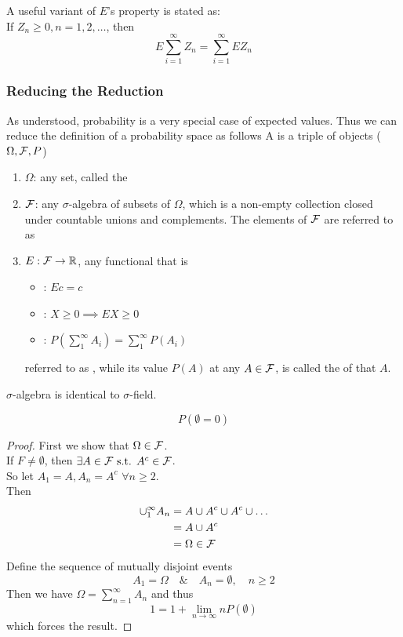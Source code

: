 \documentclass[11pt]{article}
\numberwithin{equation}{section}
\begin{document}
\property[continuity]
A useful variant of $E$'s  property is stated as:\\
If $Z_n \geq 0, n = 1, 2, \hdots$, then 
\begin{equation}
	E\sum_{i=1}^\infty Z_n = \sum_{i=1}^\infty EZ_n
\end{equation}

\subsubsection{Reducing the Reduction}
As understood, probability is a very special case of expected values. Thus we can reduce the definition of a probability space as follows
A  is a triple of objects ($\Omega, \mathcal{F}, P$)
\begin{enumerate}
	\item $\Omega$: any set, called the 
	\item $\mathcal{F}$: any $\sigma$-algebra of subsets of $\Omega$, which is a non-empty collection closed under countable unions and complements. The elements of $\mathcal{F}$ are referred to as 
	\item $E: \mathcal{F} \rightarrow \mathbb{R}$, any functional that is 
	\begin{itemize}
		\item {}: $Ec = c$
		\item {}: $X \geq 0 \implies EX \geq 0$
		\item {}: $P(\sum_1^{\infty}A_i) = \sum_1^{\infty}P(A_i)$
	\end{itemize}
	referred to as , while its value $P(A)$ at any $A \in \mathcal{F}$, is called the  of that $A$.
\end{enumerate} 

\remark
$\sigma$-algebra is identical to $\sigma$-field.

\proposition[nullity]
$$P(\emptyset = 0)$$
\begin{proof}
	First we show that $\Omega \in \mathcal{F}$. \\
	If $F \neq \emptyset$, then $\exists A \in \mathcal{F} \text{ s.t. } A^c \in \mathcal{F}$. \\
	So let $A_1 = A, A_n = A^c \,\, \forall n \geq 2$. \\
	Then 
	\begin{align*}
		\cup_1^\infty A_n &= A \cup A^c \cup A^c \cup \hdots \\
		&= A \cup A^c \\
		&= \Omega \in \mathcal{F}
	\end{align*}
	Define the sequence of mutually disjoint events
	$$A_1 = \Omega \quad \& \quad A_n = \emptyset, \quad n \geq 2$$
	Then we have $\Omega = \sum_{n=1}^\infty A_n$ and thus 
	$$ 1 = 1 + \lim_{n\rightarrow\infty} nP(\emptyset)$$
	which forces the result.
\end{proof}
\end{document}

